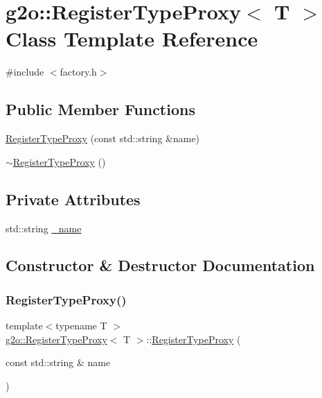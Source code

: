 \hypertarget{classg2o_1_1_register_type_proxy}{}\section{g2o\+:\+:Register\+Type\+Proxy$<$ T $>$ Class Template Reference}
\label{classg2o_1_1_register_type_proxy}


{\ttfamily \#include $<$factory.\+h$>$}

\subsection*{Public Member Functions}
\begin{DoxyCompactItemize}
\item 
\mbox{\hyperlink{classg2o_1_1_register_type_proxy_a179d0d498d8a53f9432d1635019705f5}{Register\+Type\+Proxy}} (const std\+::string \&name)
\item 
\mbox{\hyperlink{classg2o_1_1_register_type_proxy_ab8469d11a8e3548e74b1de4b3a332d4e}{$\sim$\+Register\+Type\+Proxy}} ()
\end{DoxyCompactItemize}
\subsection*{Private Attributes}
\begin{DoxyCompactItemize}
\item 
std\+::string \mbox{\hyperlink{classg2o_1_1_register_type_proxy_a34c9e807a21fc0dbafd8980c17bf77f9}{\+\_\+name}}
\end{DoxyCompactItemize}


\subsection{Constructor \& Destructor Documentation}
\mbox{\label{classg2o_1_1_register_type_proxy_a179d0d498d8a53f9432d1635019705f5}} 
\subsubsection{\texorpdfstring{Register\+Type\+Proxy()}{RegisterTypeProxy()}}
{\footnotesize\ttfamily template$<$typename T $>$ \\
\mbox{\hyperlink{classg2o_1_1_register_type_proxy}{g2o\+::\+Register\+Type\+Proxy}}$<$ T $>$\+::\mbox{\hyperlink{classg2o_1_1_register_type_proxy}{Register\+Type\+Proxy}} (\begin{DoxyParamCaption}\item[{const std\+::string \&}]{name }\end{DoxyParamCaption})\hspace{0.3cm}{\ttfamily [inline]}}

